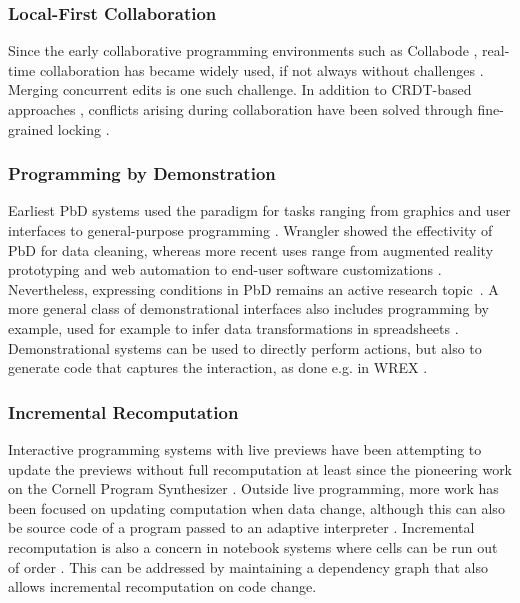 \documentclass[sigconf,anonymous,screen]{acmart}
\begin{document}
\subsubsection*{Local-First Collaboration}
Since the early collaborative programming environments such as Collabode \cite{goldman-2011-collaborative},
real-time collaboration has became widely used, if not always without challenges \cite{tan-2024-vslive}.
Merging concurrent edits is one such challenge.
In addition to CRDT-based approaches \cite{klokmose-2024-mywebstrates}, conflicts arising during
collaboration have been solved through fine-grained locking \cite{wang-2024-nbconflicts}.

\subsubsection*{Programming by Demonstration}
Earliest PbD systems used the paradigm for tasks ranging from graphics
and user interfaces to general-purpose programming \cite{smith-1975-pygmalion,cypher-1993-pbd}.
Wrangler \cite{kandel-2011-wrangler} showed the effectivity of PbD for data cleaning,
whereas more recent uses range from augmented reality prototyping \cite{leiva-2021-rapido}
and web automation \cite{chen-2023-miwa} to end-user software customizations
\cite{litt-2020-customization,litt-2020-wildcard}. Nevertheless, expressing conditions in PbD remains an
active research topic~\cite{pu-2022-semanticon,radensky-2018-conditionals}. A more general class of demonstrational
interfaces \cite{myers-2000-demonstrational} also includes programming by example, used
for example to infer data transformations in spreadsheets \cite{gulwani-2012-spreadsheets}.
Demonstrational systems can be used to directly perform actions, but also to generate code
that captures the interaction, as done e.g. in WREX \cite{drossos-2020-wrex}.

\subsubsection*{Incremental Recomputation}
Interactive programming systems with live previews \cite{petricek-2020-live,mcdirmid-2013-usable}
have been attempting to update the previews without full recomputation at least since the pioneering
work on the Cornell Program Synthesizer \cite{teitelbaum-1981-cps}. Outside live programming,
more work has been focused on updating computation when data change, although this can also
be source code of a program passed to an adaptive interpreter \cite{acar-2006-adaptive}.
Incremental recomputation is also a concern in notebook systems where cells can be run out of
order \cite{singer-2020-jollity}. This can be addressed by maintaining a dependency graph
\cite{petricek-2018-wrattler,koop-2017-dataflow} that also allows incremental recomputation
on code change.
\end{document}
